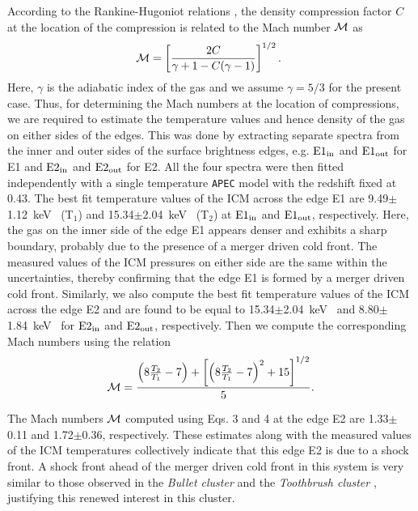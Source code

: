 \documentclass[useASM,usenatbib]{mn2e}
\newcommand\kev{{\rm~keV}}
\begin{document}
According to the Rankine-Hugoniot relations \citep{1959flme.book.....L}, the density compression factor $C$ at the location of the compression is related to the Mach number ${\cal M}$ as
\begin{equation}
{\cal M}=\left[\frac{2 C}{\gamma + 1 - C(\gamma -1)}\right]^{1/2} .\mbox{ }
\label{eq:machne}
\end{equation}
\noindent Here, $\gamma$ is the adiabatic index of the gas and we
assume $\gamma=5/3$ for the present case. Thus, for determining the
Mach numbers at the location of compressions, we are required to
estimate the temperature values and hence density of the gas on either
sides of the edges. This was done by extracting separate spectra from
the inner and outer sides of the surface brightness edges, e.g. ${\rm
  E1_{in}}$ and ${\rm E1_{out}}$ for E1 and ${\rm E2_{in}}$ and ${\rm
  E2_{out}}$ for E2. All the four spectra were then fitted
independently with a single temperature {\tt APEC} model with the
redshift fixed at 0.43. The best fit temperature values of the ICM
across the edge E1 are 9.49$\pm$1.12\kev~ (T$_1$) and
15.34$\pm$2.04\kev~ (T$_2$) at ${\rm E1_{in}}$ and ${\rm E1_{out}}$,
respectively. Here, the gas on the inner side of the edge E1 appears
denser and exhibits a sharp boundary, probably due to the presence of
a merger driven cold front. The measured values of the ICM pressures
 on either side are the same within the uncertainties, thereby confirming that the edge E1
is formed by a merger driven cold front. Similarly, we also compute
the best fit temperature values of the ICM across the edge E2 and are
found to be equal to 15.34$\pm$2.04\kev~ and 8.80$\pm$1.84\kev~ for
${\rm E2_{in}}$ and ${\rm E2_{out}}$, respectively.
Then we compute the corresponding Mach numbers using the relation \citep{1959flme.book.....L}
 \begin{equation}
{\cal M}=   \frac{ \left( 8 \frac{T_2}{T_1} - 7 \right) + \left[ \left( 8 \frac{T_2}{T_1} - 7 \right)^2 + 15 \right]^{1/2} }{5}    \mbox{.}
\label{eq:machT}
\end{equation}
 
The Mach numbers ${\cal M}$ computed using Eqs. 3 and 4 at the edge E2
are 1.33$\pm$0.11 and 1.72$\pm$0.36, respectively.  These estimates
along with the measured values of the ICM temperatures collectively
indicate that this edge E2 is due to a shock front. A shock front
ahead of the merger driven cold front in this system is very similar
to those observed in the \textit{Bullet cluster}
\cite{2002ApJ...567L..27M} and the \textit{Toothbrush cluster}
\cite{2016ApJ...818..204V}, justifying this renewed interest
in this cluster.
\end{document}
